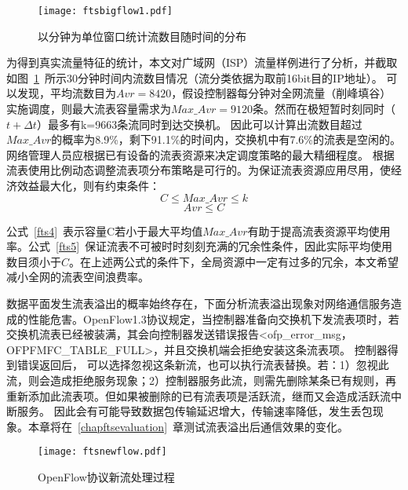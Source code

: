 \begin{figure}[!ht]
	\vspace{-1.5mm}
	\centering 
	\texttt{[image: ftsbigflow1.pdf]}
	\caption{以分钟为单位窗口统计流数目随时间的分布} \label{fig:ftsbigflow}
\end{figure}

为得到真实流量特征的统计，本文对广域网（ISP）流量样例进行了分析，并截取如图~\ref{fig:ftsbigflow}~所示30分钟时间内流数目情况（流分类依据为取前16bit目的IP地址）。
可以发现，平均流数目为$Avr=8420$，假设控制器每分钟对全网流量（削峰填谷）实施调度，则最大流表容量需求为$Max\_Avr=9120$条。然而在极短暂时刻同时（$t+\Delta t$）最多有k=9663条流同时到达交换机。
因此可以计算出流数目超过$Max\_Avr$的概率为8.9\%，剩下91.1\%的时间内，交换机中有7.6\%的流表是空闲的。
网络管理人员应根据已有设备的流表资源来决定调度策略的最大精细程度。
根据流表使用比例动态调整流表项分布策略是可行的。为保证流表资源应用尽用，使经济效益最大化，则有约束条件：
\begin{equation}\label{fts4}
C \leq Max\_Avr \leq k 
\end{equation}
\begin{equation}\label{fts5}
Avr \leq C 
\end{equation}

公式~\ref{fts4}~表示容量C若小于最大平均值$Max\_Avr$有助于提高流表资源平均使用率。公式~\ref{fts5}~保证流表不可被时时刻刻充满的冗余性条件，因此实际平均使用数目须小于$C$。在上述两公式的条件下，全局资源中一定有过多的冗余，本文希望减小全网的流表空间浪费率。

数据平面发生流表溢出的概率始终存在，下面分析流表溢出现象对网络通信服务造成的性能危害。OpenFlow1.3协议规定，当控制器准备向交换机下发流表项时，若交换机流表已经被装满，其会向控制器发送错误报告<ofp\_error\_msg，OFPFMFC\_TABLE\_FULL>，并且交换机端会拒绝安装这条流表项。
控制器得到错误返回后， 可以选择忽视这条新流，也可以执行流表替换。若：1）忽视此流，则会造成拒绝服务现象；2）控制器服务此流，则需先删除某条已有规则，再重新添加此流表项。但如果被删除的已有流表项是活跃流，继而又会造成活跃流中断服务。
因此会有可能导致数据包传输延迟增大，传输速率降低，发生丢包现象。本章将在~\ref{chapftsevaluation}~章测试流表溢出后通信效果的变化。



\begin{figure}[!ht]
	\centering 
	\vspace{-1.5mm} 
	\texttt{[image: ftsnewflow.pdf]}
	\caption{OpenFlow协议新流处理过程} \label{fig:ftsnewflow}
\end{figure}

